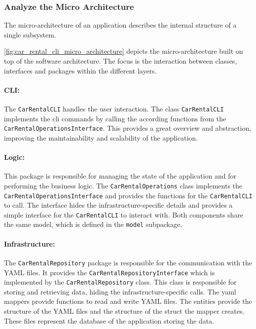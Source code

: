 \subsubsection*{Analyze the Micro Architecture}
The micro-architecture of an application describes the internal structure of a single subsystem.

\autoref{fig:car_rental_cli_micro_architecture} depicts the micro-architecture built on top of the software architecture.
The focus is the interaction between classes, interfaces and packages within the different layers.

\paragraph*{CLI:}
The \texttt{CarRentalCLI} handles the user interaction.
The class \texttt{CarRentalCLI} implements the cli commands by calling the according functions from the \hfill \linebreak \texttt{CarRentalOperationsInterface}.
This provides a great overview and abstraction, improving the maintainability and scalability of the application.

\paragraph*{Logic:}
This package is responsible for managing the state of the application and for performing the business logic.
The \texttt{CarRentalOperations} class implements the \texttt{CarRentalOperationsInterface} and provides the functions for the \texttt{CarRentalCLI} to call.
The interface hides the infrastructure-specific details and provides a simple interface for the \texttt{CarRentalCLI} to interact with.
Both components share the same model, which is defined in the \texttt{model} subpackage.

\paragraph*{Infrastructure:}
The \texttt{CarRentalRepository} package is responsible for the communication with the YAML files.
It provides the \texttt{CarRentalRepositoryInterface} which is implemented by the \texttt{CarRentalRepository} class.
This class is responsible for storing and retrieving data, hiding the infrastructure-specific calls.
The yaml mappers provide functions to read and write YAML files.
The entities provide the structure of the YAML files and the structure of the struct the mapper creates.
These files represent the database of the application storing the data.

